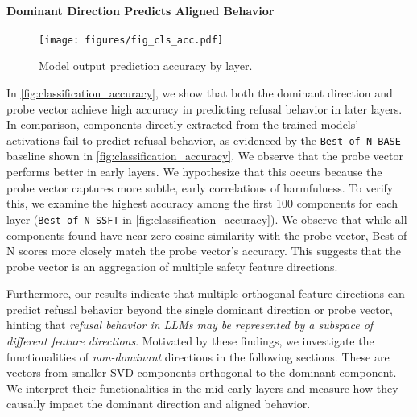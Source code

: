 

\paragraph{Dominant Direction Predicts Aligned Behavior}

\begin{figure}
    \vskip 0.2in
    \begin{center}
    \centerline{\texttt{[image: figures/fig\_cls\_acc.pdf]}}
    \caption{Model output prediction accuracy by layer.}
    \label{fig:classification_accuracy}
    \end{center}
    \vskip -0.2in
\end{figure}


In \autoref{fig:classification_accuracy}, we show that both the dominant direction and probe vector achieve high accuracy in predicting refusal behavior in later layers. In comparison, components directly extracted from the trained models' activations fail to predict refusal behavior, as evidenced by the \texttt{Best-of-N BASE} baseline shown in \autoref{fig:classification_accuracy}.
We observe that the probe vector performs better in early layers. We hypothesize that this occurs because the probe vector captures more subtle, early correlations of harmfulness. To verify this, we examine the highest accuracy among the first 100 components for each layer (\texttt{Best-of-N SSFT} in \autoref{fig:classification_accuracy}). We observe that while all components found have near-zero cosine similarity with the probe vector, Best-of-N scores more closely match the probe vector's accuracy. This suggests that the probe vector is an aggregation of multiple safety feature directions.


Furthermore, our results indicate that multiple orthogonal feature directions can predict refusal behavior beyond the single dominant direction or probe vector, hinting that \emph{refusal behavior in LLMs may be represented by a subspace of different feature directions}. Motivated by these findings, we investigate the functionalities of \textit{non-dominant} directions in the following sections. These are vectors from smaller SVD components orthogonal to the dominant component. We interpret their functionalities in the mid-early layers and measure how they causally impact the dominant direction and aligned behavior.